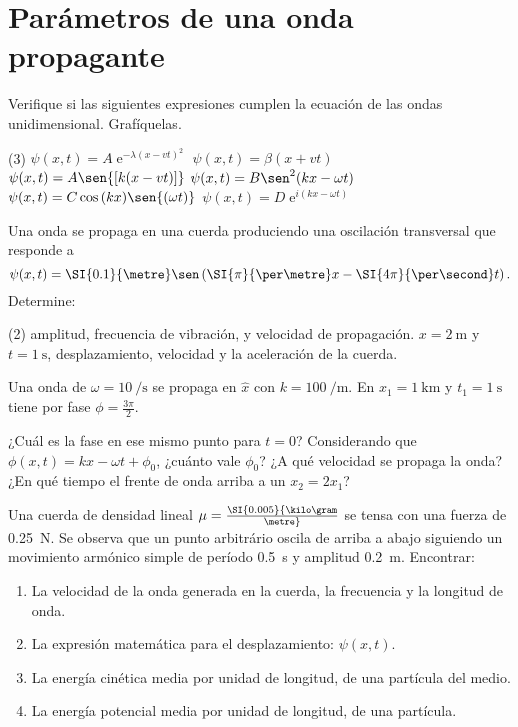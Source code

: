 \section*{Parámetros de una onda propagante}


\item Verifique si las siguientes expresiones cumplen la ecuación de las ondas unidimensional.
Grafíquelas.
\begin{tasks}(3)
	\task $\psi(x,t)= A \operatorname{e}^{- \lambda ( x - v t)^2 }$
	\task $\psi(x,t)= \beta ( x + v t )$
	\task $\psi(x,t)= A \sen{\left[ k (x - v t) \right] }$
	\task $\psi(x,t)= B \sen^2{ \left( k x -\omega t \right) }$
	\task $\psi(x,t)= C \cos{(k x)} \sen{ \left( \omega t \right) }$
	\task $\psi(x,t)= D \operatorname{e}^{i ( k x - \omega t ) }$
\end{tasks}



\item Una onda se propaga en una cuerda produciendo una oscilación transversal que responde a 
\[
\psi(x,t) = \SI{0.1}{\metre} \sen \left( \SI{\pi}{\per\metre} x - \SI{4 \pi}{\per\second} t \right).
\]
Determine:
\begin{tasks}(2)
	\task amplitud,
	\task frecuencia de vibración, y
	\task velocidad de propagación.
	\task $x = \SI{2}{\metre}$ y $ t = \SI{1}{\second}$, desplazamiento, velocidad y la aceleración de la cuerda.
\end{tasks}



\item Una onda de $\omega= \SI{10}{\per\second}$ se propaga en $\hat{x}$ con $k = \SI{100}{\per\metre}$.
En $x_1 = \SI{1}{\kilo\metre}$ y $t_1 = \SI{1}{\second}$ tiene por fase $\phi = \frac{3 \pi}{2}$.
\begin{tasks}
	\task ¿Cuál es la fase en ese mismo punto para $t = 0$?
	\task Considerando que $\phi(x,t) = k x - \omega t+ \phi_0$, ¿cuánto vale $\phi_0$?
	\task ¿A qué velocidad se propaga la onda?
	\task ¿En qué tiempo el frente de onda arriba a un $x_2 = 2 x_1$?
\end{tasks}



\item Una cuerda de densidad lineal $\mu = \SI{0.005}{\kilo\gram\over\metre}$ se tensa con una fuerza de \SI{0.25}{\newton}.
Se observa que un punto arbitrário oscila de arriba a abajo siguiendo un movimiento armónico simple de período \SI{0.5}{\second} y amplitud \SI{0.2}{\metre}.
Encontrar:
\begin{enumerate}
	\item La velocidad de la onda generada en la cuerda, la frecuencia y la longitud de onda.
	\item La expresión matemática para el desplazamiento: $\psi(x,t)$.
	\item La energía cinética media por unidad de longitud, de una partícula del medio.
	\item La energía potencial media por unidad de longitud, de una partícula.
\end{enumerate}
